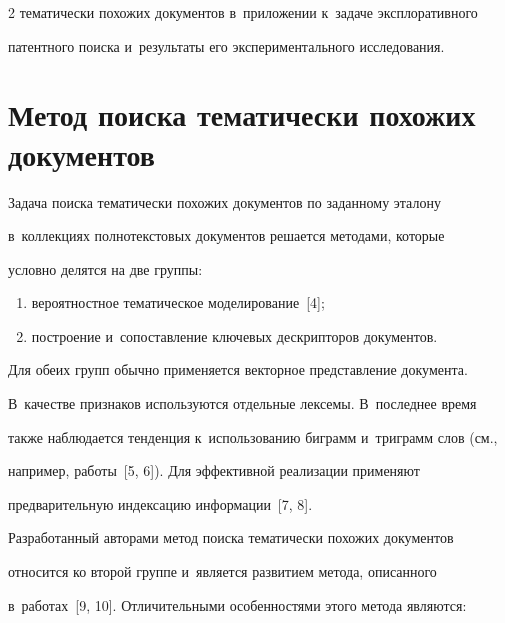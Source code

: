 \begin{multicols}{2}
тематически похожих документов в~приложении к~задаче эксплоративного 

патентного поиска и~результаты его экспериментального исследования.



\vspace*{-9pt}

  

\section{Метод поиска тематически похожих документов}



\vspace*{-3pt}

     

  Задача поиска тематически похожих документов по заданному эталону 

в~коллекциях полнотекстовых документов решается методами, которые 

условно делятся на две группы:

  \begin{enumerate}[(1)]

  \item  вероятностное тематическое моделирование~[4];

    \item  построение и~сопоставление ключевых дескрипторов документов. 

    \end{enumerate}

    

  Для обеих групп обычно применяется векторное представление документа. 

В~качестве признаков используются  отдельные лексемы. В~последнее время 

также наблюдается тенденция к~использованию биграмм и~триграмм слов (см., 

например, работы~[5, 6]). Для эффективной реализации применяют 

предварительную индексацию информации~[7, 8].

  

  Разработанный авторами метод поиска тематически похожих документов 

относится ко второй группе и~является развитием метода, описанного 

в~работах~[9, 10]. Отличительными особенностями этого метода являются: 

  \begin{itemize}


\end{itemize}
\end{multicols}
